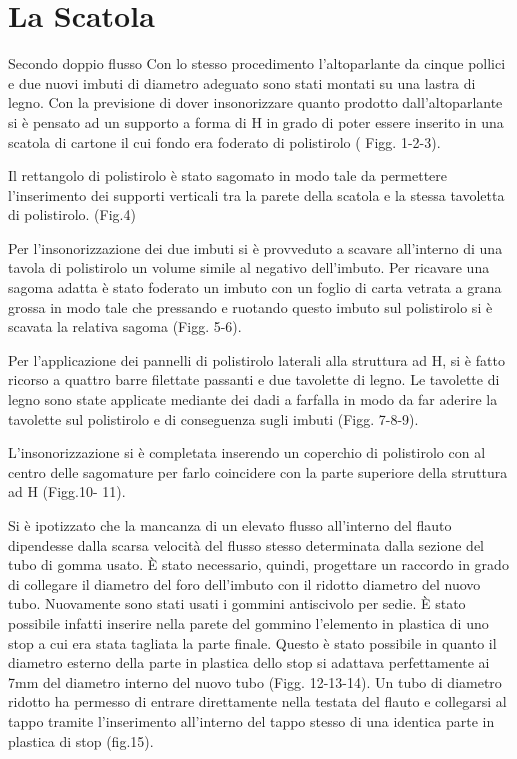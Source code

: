 \section{La Scatola}

Secondo doppio flusso
Con lo stesso procedimento l’altoparlante da cinque pollici e due nuovi  imbuti di diametro adeguato sono stati montati su una lastra di legno.
Con la previsione di dover insonorizzare quanto prodotto dall’altoparlante  si è pensato ad un supporto a forma di H in grado di poter essere inserito in una scatola di cartone il cui fondo era foderato di polistirolo ( Figg. 1-2-3).

Il rettangolo di polistirolo è stato sagomato in modo tale da permettere l’inserimento dei supporti verticali tra la parete della scatola e la stessa tavoletta di polistirolo. (Fig.4)

Per l’insonorizzazione dei due imbuti si è provveduto a scavare  all’interno di una tavola di polistirolo  un volume simile al negativo dell’imbuto.
Per ricavare una sagoma adatta è stato foderato un imbuto con un foglio di carta vetrata  a grana grossa  in modo tale che pressando e ruotando  questo imbuto sul polistirolo si è scavata la relativa sagoma (Figg. 5-6).


Per l’applicazione dei pannelli di polistirolo laterali alla struttura ad H, si è fatto ricorso a quattro barre filettate passanti  e due  tavolette di legno.  Le tavolette di legno sono state applicate mediante dei dadi a farfalla  in modo da far aderire la tavolette sul polistirolo e di conseguenza sugli imbuti (Figg. 7-8-9).

L’insonorizzazione si è completata inserendo un coperchio di polistirolo con al centro delle sagomature per farlo coincidere con la parte superiore della struttura ad H (Figg.10- 11).

Si è ipotizzato che la mancanza di un elevato flusso all’interno del flauto dipendesse dalla scarsa velocità del flusso stesso determinata dalla  sezione del tubo di gomma usato. È stato necessario, quindi, progettare un raccordo in grado di collegare il diametro del foro dell’imbuto con il ridotto diametro del nuovo tubo. Nuovamente sono stati usati i gommini antiscivolo per sedie.
È stato possibile infatti inserire nella parete del gommino l’elemento in plastica di uno stop a cui era stata tagliata la  parte finale. Questo è stato possibile in quanto il diametro esterno  della parte in plastica dello stop si adattava perfettamente ai 7mm del diametro interno del nuovo tubo (Figg. 12-13-14). Un tubo di diametro ridotto ha permesso di entrare direttamente nella testata del flauto e collegarsi al tappo tramite l’inserimento all’interno del tappo stesso  di una identica parte in plastica di stop (fig.15).

